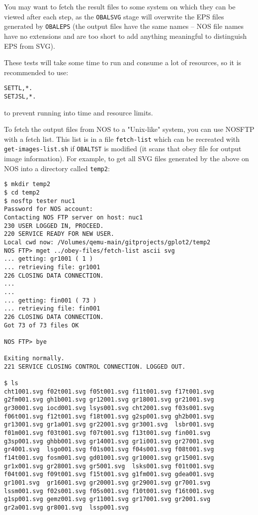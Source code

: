 \documentclass[a4paper,twoside,11pt]{article}
\newcommand{\newpara}{\par\vspace{4mm}\noindent}
\begin{document}
\newpara
You may want to fetch the result files to some system on which they can be
viewed after each step, as the \texttt{OBALSVG} stage will overwrite the EPS files
generated by \texttt{OBALEPS} (the output files have the same names -- NOS file names
have no extensions and are too short to add anything meaningful to distinguish 
EPS from SVG).

\newpara
These tests will take some time to run and consume a lot of resources, so
it is recommended to use:
\begin{lstlisting}
SETTL,*.
SETJSL,*.
\end{lstlisting}
to prevent running into time and resource limits.

\newpara
To fetch the output files from NOS to a "Unix-like" system, you can use NOSFTP
with a fetch list. This list is in a file \texttt{fetch-list} which can be recreated
with \texttt{get-images-list.sh} if \texttt{OBALTST} is modified (it scans that obey file for
output image information). For example, to get all SVG files generated by the above
on NOS into a directory called \texttt{temp2}:
\begin{lstlisting}
$ mkdir temp2
$ cd temp2
$ nosftp tester nuc1
Password for NOS account: 
Contacting NOS FTP server on host: nuc1
230 USER LOGGED IN, PROCEED.
220 SERVICE READY FOR NEW USER.
Local cwd now: /Volumes/qemu-main/gitprojects/gplot2/temp2
NOS FTP> mget ../obey-files/fetch-list ascii svg
... getting: gr1001 ( 1 )
... retrieving file: gr1001
226 CLOSING DATA CONNECTION.
...
...
... getting: fin001 ( 73 )
... retrieving file: fin001
226 CLOSING DATA CONNECTION.
Got 73 of 73 files OK

NOS FTP> bye

Exiting normally.
221 SERVICE CLOSING CONTROL CONNECTION. LOGGED OUT.

$ ls
cht1001.svg f02t001.svg f05t001.svg f11t001.svg f17t001.svg	
g2fm001.svg gh1b001.svg gr12001.svg gr18001.svg gr21001.svg	
gr30001.svg iocd001.svg lsys001.svg cht2001.svg f03s001.svg	
f06t001.svg f12t001.svg f18t001.svg g2sp001.svg gh2b001.svg	
gr13001.svg gr1a001.svg gr22001.svg gr3001.svg  lsbr001.svg
f01m001.svg f03t001.svg f07t001.svg f13t001.svg fin001.svg	
g3sp001.svg ghbb001.svg gr14001.svg gr1i001.svg gr27001.svg	
gr4001.svg  lsgo001.svg f01s001.svg f04s001.svg f08t001.svg	
f14t001.svg fosm001.svg gd01001.svg gr10001.svg gr15001.svg	
gr1x001.svg gr28001.svg gr5001.svg  lsks001.svg f01t001.svg	
f04t001.svg f09t001.svg f15t001.svg g1fm001.svg gdea001.svg	
gr1001.svg  gr16001.svg gr20001.svg gr29001.svg gr7001.svg	
lssm001.svg f02s001.svg f05s001.svg f10t001.svg f16t001.svg	
g1sp001.svg gemz001.svg gr11001.svg gr17001.svg gr2001.svg	
gr2a001.svg gr8001.svg  lssp001.svg
\end{lstlisting}
\end{document}
